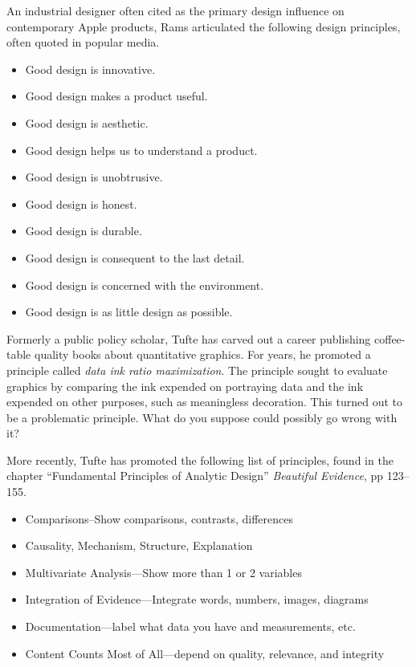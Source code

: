 \hypertarget{dieter-rams-1}{%
\label{dieter-rams-1}}

An industrial designer often cited as the primary design influence on
contemporary Apple products, Rams articulated the following design
principles, often quoted in popular media.

\begin{itemize}
\tightlist
\item
  Good design is innovative.
\item
  Good design makes a product useful.
\item
  Good design is aesthetic.
\item
  Good design helps us to understand a product.
\item
  Good design is unobtrusive.
\item
  Good design is honest.
\item
  Good design is durable.
\item
  Good design is consequent to the last detail.
\item
  Good design is concerned with the environment.
\item
  Good design is as little design as possible.
\end{itemize}

\hypertarget{edward-tufte-1}{%
\label{edward-tufte-1}}

Formerly a public policy scholar, Tufte has carved out a career
publishing coffee-table quality books about quantitative graphics. For
years, he promoted a principle called \emph{data ink ratio
maximization}. The principle sought to evaluate graphics by comparing
the ink expended on portraying data and the ink expended on other
purposes, such as meaningless decoration. This turned out to be a
problematic principle. What do you suppose could possibly go wrong with
it?

More recently, Tufte has promoted the following list of principles,
found in the chapter ``Fundamental Principles of Analytic Design''
\textit{Beautiful Evidence}, pp 123--155.

\begin{itemize}
\tightlist
\item
  Comparisons--Show comparisons, contrasts, differences
\item
  Causality, Mechanism, Structure, Explanation
\item
  Multivariate Analysis---Show more than 1 or 2 variables
\item
  Integration of Evidence---Integrate words, numbers, images, diagrams
\item
  Documentation---label what data you have and measurements, etc.
\item
  Content Counts Most of All---depend on quality, relevance, and
  integrity
\end{itemize}


